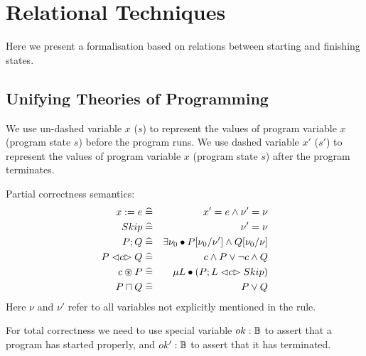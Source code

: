 \section{Relational Techniques}

Here we present a formalisation based on relations between starting
and finishing states.

\subsection{Unifying Theories of Programming}

We use un-dashed variable $x$ ($s$)
to represent the values of program variable $x$ (program state $s$)
before the program runs.
We use dashed variable $x'$ ($s'$)
to represent the values of program variable $x$ (program state $s$)
after the program terminates.


Partial correctness semantics:
\begin{eqnarray*}
   x := e      &\mathrel{\widehat=}& x' = e \land \nu' = \nu
\\ Skip        &\mathrel{\widehat=}& \nu' = \nu
\\ P ; Q       &\mathrel{\widehat=}& \exists \nu_0 \bullet P[\nu_0/\nu'] \land Q[\nu_0/\nu]
\\ P \mathrel{\lhd {c} \rhd} Q &\mathrel{\widehat=}& c \land P \lor \lnot c \land Q
\\ c \circledast P    &\mathrel{\widehat=}& \mu L \bullet (P;L \mathrel{\lhd {c} \rhd} Skip)
\\ P \sqcap Q    &\mathrel{\widehat=}& P \lor Q
\end{eqnarray*}
Here $\nu$ and $\nu'$ refer to all variables not explicitly
mentioned in the rule.


For total correctness we need to
use special variable $ok:\mathbb{B}$ to assert that a program has started properly,
and $ok':\mathbb{B}$ to assert that it has terminated.
